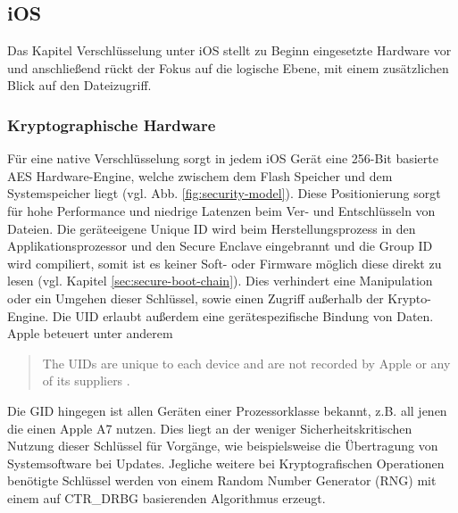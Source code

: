 \subsection{iOS}
	Das Kapitel Verschlüsselung unter iOS stellt zu Beginn eingesetzte Hardware vor
	und anschließend rückt der Fokus auf die logische Ebene, mit einem zusätzlichen
	Blick auf den Dateizugriff.
	\subsubsection{Kryptographische Hardware}\label{sec:crypto-engine}
		Für eine native Verschlüsselung sorgt in jedem iOS Gerät eine 256-Bit
		basierte AES Hardware-Engine, welche zwischem dem Flash	Speicher und dem
		Systemspeicher liegt (vgl. Abb. \ref{fig:security-model}). Diese
		Positionierung sorgt für hohe Performance und niedrige Latenzen beim
		Ver- und Entschlüsseln von Dateien. Die geräteeigene Unique ID wird beim
		Herstellungsprozess in den Applikationsprozessor und den Secure Enclave
		eingebrannt und die Group ID wird compiliert, somit ist es keiner Soft- oder
		Firmware möglich diese direkt zu lesen (vgl. Kapitel
		\ref{sec:secure-boot-chain}). Dies verhindert eine Manipulation oder ein
		Umgehen dieser Schlüssel, sowie einen Zugriff außerhalb der Krypto-Engine.
		Die UID erlaubt außerdem eine gerätespezifische Bindung von Daten. Apple
		beteuert unter anderem
		\begin{quote}
			The UIDs are unique to each device and are not recorded by Apple or any of its
			suppliers \cite[S. 9]{iOSSecurityApr2015}.
		\end{quote}
		Die GID hingegen ist allen Geräten einer
		Prozessorklasse bekannt, z.B.
		all jenen die einen Apple A7 nutzen. Dies liegt an der weniger
		Sicherheitskritischen Nutzung dieser Schlüssel für Vorgänge,
		wie beispielsweise die Übertragung von Systemsoftware bei Updates. Jegliche
		weitere bei Kryptografischen Operationen benötigte Schlüssel werden von einem
		Random Number Generator (RNG) mit einem auf	CTR\_DRBG \cite{NISTDRBG2012}
		basierenden Algorithmus erzeugt.
